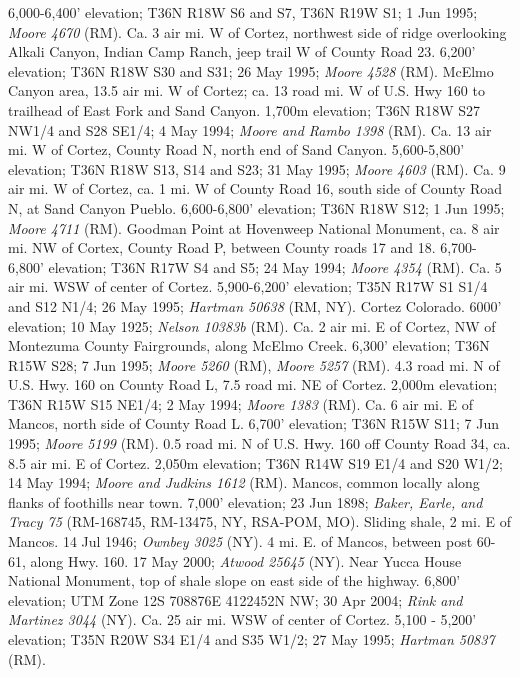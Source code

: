 6,000-6,400' elevation; T36N R18W S6 and S7, T36N R19W S1; 1 Jun 1995;
\textit{Moore 4670} (RM).
Ca. 3 air mi. W of Cortez, northwest side of ridge overlooking Alkali Canyon,
Indian Camp Ranch, jeep trail W of County Road 23. 6,200' elevation;
T36N R18W S30 and S31; 26 May 1995; \textit{Moore 4528} (RM).
McElmo Canyon area, 13.5 air mi. W of Cortez; ca. 13 road mi. W of U.S. Hwy 160
to trailhead of East Fork and Sand Canyon. 1,700m elevation; T36N R18W
S27 NW1/4 and S28 SE1/4; 4 May 1994; \textit{Moore and Rambo 1398} (RM).
Ca. 13 air mi. W of Cortez, County Road N, north end of Sand Canyon.
5,600-5,800' elevation; T36N R18W S13, S14 and S23; 31 May 1995;
\textit{Moore 4603} (RM).
Ca. 9 air mi. W of Cortez, ca. 1 mi. W of County Road 16, south side of County
Road N, at Sand Canyon Pueblo. 6,600-6,800' elevation; T36N R18W S12;
1 Jun 1995; \textit{Moore 4711} (RM).
Goodman Point at Hovenweep National Monument, ca. 8 air mi. NW of Cortex,
County Road P, between County roads 17 and 18. 6,700-6,800' elevation;
T36N R17W S4 and S5; 24 May 1994; \textit{Moore 4354} (RM).
Ca. 5 air mi. WSW of center of Cortez. 5,900-6,200' elevation; T35N R17W S1 S1/4
and S12 N1/4; 26 May 1995; \textit{Hartman 50638} (RM, NY).
Cortez Colorado. 6000' elevation; 10 May 1925; \textit{Nelson 10383b} (RM).
Ca. 2 air mi. E of Cortez, NW of Montezuma County Fairgrounds, along McElmo
Creek. 6,300' elevation; T36N R15W S28; 7 Jun 1995; \textit{Moore 5260} (RM),
\textit{Moore 5257} (RM).
4.3 road mi. N of U.S. Hwy. 160 on County Road L, 7.5 road mi. NE of Cortez.
2,000m elevation; T36N R15W S15 NE1/4; 2 May 1994; \textit{Moore 1383} (RM).
Ca. 6 air mi. E of Mancos, north side of County Road L. 6,700' elevation;
T36N R15W S11; 7 Jun 1995; \textit{Moore 5199} (RM).
0.5 road mi. N of U.S. Hwy. 160 off County Road 34, ca. 8.5 air mi. E of Cortez.
2,050m elevation; T36N R14W S19 E1/4 and S20 W1/2; 14 May 1994;
\textit{Moore and Judkins 1612} (RM).
Mancos, common locally along flanks of foothills near town.
7,000' elevation; 23 Jun 1898;
\textit{Baker, Earle, and Tracy 75} (RM-168745, RM-13475, NY, RSA-POM, MO).
Sliding shale, 2 mi. E of Mancos. 14 Jul 1946; \textit{Ownbey 3025} (NY).
4 mi. E. of Mancos, between post 60-61, along Hwy. 160. 17 May 2000;
\textit{Atwood 25645} (NY).
Near Yucca House National Monument, top of shale slope on east side of the
highway. 6,800' elevation; UTM Zone 12S 708876E 4122452N NW; 30 Apr 2004;
\textit{Rink and Martinez 3044} (NY).
Ca. 25 air mi. WSW of center of Cortez. 5,100 - 5,200' elevation; T35N R20W S34
E1/4 and S35 W1/2; 27 May 1995; \textit{Hartman 50837} (RM).
